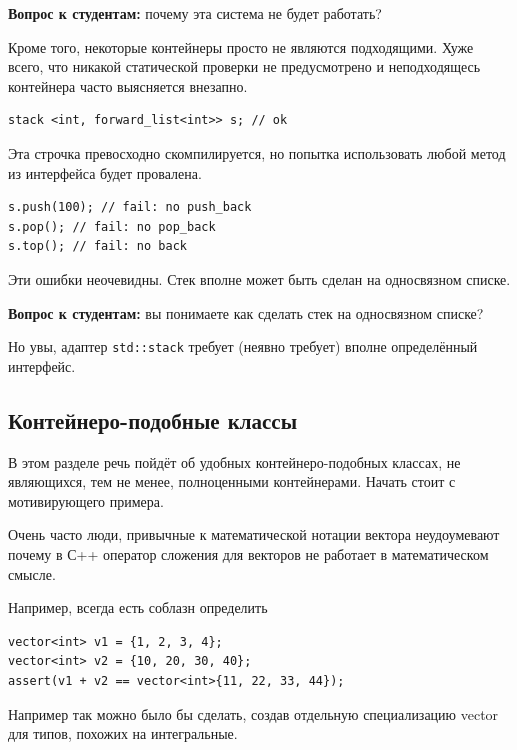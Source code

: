 \documentclass[a4paper,12pt,oneside]{book}
\newif\ifanswers
\begin{document}
\textbf{Вопрос к студентам:} почему эта система не будет работать?

\ifanswers
Правильный ответ: потому что у вектора не один шаблонный параметр
\fi

Кроме того, некоторые контейнеры просто не являются подходящими. Хуже всего, что никакой статической проверки не предусмотрено и неподходящесь контейнера часто выясняется внезапно.

\begin{lstlisting}
stack <int, forward_list<int>> s; // ok
\end{lstlisting}

Эта строчка превосходно скомпилируется, но попытка использовать любой метод из интерфейса будет провалена.

\begin{lstlisting}
s.push(100); // fail: no push_back
s.pop(); // fail: no pop_back
s.top(); // fail: no back
\end{lstlisting}

Эти ошибки неочевидны. Стек вполне может быть сделан на односвязном списке.

\textbf{Вопрос к студентам:} вы понимаете как сделать стек на односвязном списке?

\ifanswers
Правильный ответ: добавлять в голову и удалять с головы.
\fi

Но увы, адаптер \lstinline!std::stack! требует (неявно требует) вполне определённый интерфейс.

\subsection{Контейнеро-подобные классы}

В этом разделе речь пойдёт об удобных контейнеро-подобных классах, не являющихся, тем не менее, полноценными контейнерами. Начать стоит с мотивирующего примера.

Очень часто люди, привычные к математической нотации вектора неудоумевают почему в С++ оператор сложения для векторов не работает в математическом смысле.

Например, всегда есть соблазн определить

\begin{lstlisting}
vector<int> v1 = {1, 2, 3, 4};
vector<int> v2 = {10, 20, 30, 40};
assert(v1 + v2 == vector<int>{11, 22, 33, 44});
\end{lstlisting}

Например так можно было бы сделать, создав отдельную специализацию vector для типов, похожих на интегральные.
\end{document}
